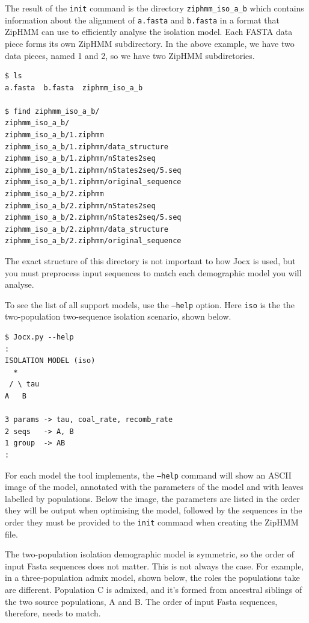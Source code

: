 \documentclass[graybox]{svmult}
\begin{document}
The result of the \texttt{init} command is the directory \texttt{ziphmm\_iso\_a\_b} which contains information about the alignment of \texttt{a.fasta} and \texttt{b.fasta} in a format that ZipHMM can use to efficiently analyse the isolation model.  Each FASTA data piece forms its own ZipHMM subdirectory.  In the above example, we have two data pieces, named 1 and 2, so we have two ZipHMM subdiretories.


 {\scriptsize{}\begin{verbatim}
$ ls
a.fasta  b.fasta  ziphmm_iso_a_b

$ find ziphmm_iso_a_b/
ziphmm_iso_a_b/
ziphmm_iso_a_b/1.ziphmm
ziphmm_iso_a_b/1.ziphmm/data_structure
ziphmm_iso_a_b/1.ziphmm/nStates2seq
ziphmm_iso_a_b/1.ziphmm/nStates2seq/5.seq
ziphmm_iso_a_b/1.ziphmm/original_sequence
ziphmm_iso_a_b/2.ziphmm
ziphmm_iso_a_b/2.ziphmm/nStates2seq
ziphmm_iso_a_b/2.ziphmm/nStates2seq/5.seq
ziphmm_iso_a_b/2.ziphmm/data_structure
ziphmm_iso_a_b/2.ziphmm/original_sequence
\end{verbatim}}

The exact structure of this directory is not important to how Jocx is used, but you must preprocess input sequences to match each demographic model you will analyse.

To see the list of all support models, use the \texttt{--help} option. Here \texttt{iso} is the the two-population two-sequence isolation scenario, shown below.

 {\scriptsize{}\begin{verbatim}
$ Jocx.py --help
:
ISOLATION MODEL (iso)
  *
 / \ tau
A   B

3 params -> tau, coal_rate, recomb_rate
2 seqs   -> A, B
1 group  -> AB
:
\end{verbatim}}

For each model the tool implements, the \texttt{--help} command will show an ASCII image of the model, annotated with the parameters of the model and with leaves labelled by populations. Below the image, the parameters are listed in the order they will be output when optimising the model, followed by the sequences in the order they must be provided to the \texttt{init} command when creating the ZipHMM file.

The two-population isolation demographic model is symmetric, so the order of input Fasta sequences does not matter. This is not always the case. For example, in a three-population admix model, shown below, the roles the populations take are different. Population C is admixed, and it's formed from ancestral siblings of the two source populations, A and B. The order of input Fasta sequences, therefore, needs to match.
\end{document}
